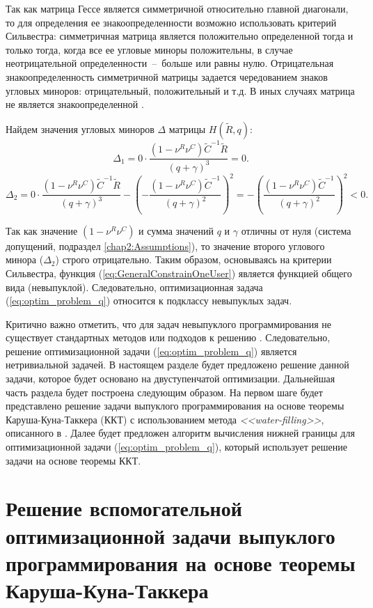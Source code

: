 Так как матрица Гессе является симметричной относительно главной диагонали, то для определения ее знакоопределенности возможно использовать критерий Сильвестра: симметричная матрица является положительно определенной тогда и только тогда, когда все ее угловые миноры положительны, в случае неотрицательной определенности~--~больше или равны нулю. Отрицательная знакоопределенность симметричной матрицы задается чередованием знаков угловых миноров: отрицательный, положительный и т.д. В иных случаях матрица не является знакоопределенной \cite{convex_opt}.

Найдем значения угловых миноров $\Delta$ матрицы $H(\tilde{R}, q)$:
$$\Delta_1 = 0 \cdot \frac{\left(1-\nu^R\nu^C\right)\tilde{C}^{-1} \tilde{R}}{(q + \gamma)^3} = 0.$$
$$\Delta_2 = 0 \cdot \frac{\left(1-\nu^R\nu^C\right)\tilde{C}^{-1} \tilde{R}}{(q + \gamma)^3} - \left(-\frac{\left(1-\nu^R\nu^C\right)\tilde{C}^{-1}}{(q + \gamma)^2}\right)^2 = - \left(\frac{\left(1-\nu^R\nu^C\right)\tilde{C}^{-1}}{(q + \gamma)^2}\right)^2 < 0.$$

Так как значение $\left(1-\nu^R\nu^C\right)$ и сумма значений $q$ и $\gamma$ отличны от нуля (система допущений, подраздел \ref{chap2:Assumptions}), то значение второго углового минора ($\Delta_2$) строго отрицательно. Таким образом, основываясь на критерии Сильвестра, функция (\ref{eq:GeneralConstrainOneUser}) является функцией общего вида (невыпуклой). Следовательно, оптимизационная задача (\ref{eq:optim_problem_q}) относится к подклассу невыпуклых задач.

Критично важно отметить, что для задач невыпуклого программирования не существует стандартных методов или подходов к решению \cite{convex_opt,optimizations_methods}. Следовательно, решение оптимизационной задачи (\ref{eq:optim_problem_q}) является нетривиальной задачей. В настоящем разделе будет предложено решение данной задачи, которое будет основано на двуступенчатой оптимизации. Дальнейшая часть раздела будет построена следующим образом. На первом шаге будет представлено решение задачи выпуклого программирования на основе теоремы Каруша-Куна-Таккера (ККТ) с использованием метода \textit{<<water-filling>>}, описанного в \cite{convex_opt}. Далее будет предложен алгоритм вычисления нижней границы для оптимизационной задачи (\ref{eq:optim_problem_q}), который использует решение задачи на основе теоремы ККТ.

\section{Решение вспомогательной оптимизационной задачи выпуклого программирования на основе теоремы Каруша-Куна-Таккера}
\label{chap4:KktSolution}

